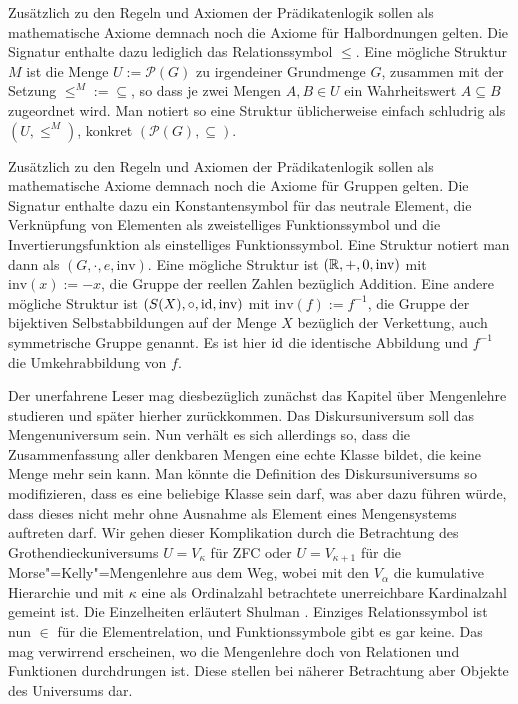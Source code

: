  Zusätzlich zu
den Regeln und Axiomen der Prädikatenlogik sollen als mathematische Axiome
demnach noch die Axiome für Halbordnungen gelten. Die Signatur enthalte
dazu lediglich das Relationssymbol $\le$. Eine mögliche Struktur $M$
ist die Menge $U:=\mathcal P(G)$ zu irgendeiner Grundmenge $G$, zusammen
mit der Setzung ${\le^M} := {\subseteq}$, so dass je zwei Mengen $A,B\in U$
ein Wahrheitswert $A\subseteq B$ zugeordnet wird. Man notiert so
eine Struktur üblicherweise einfach schludrig als $(U,\le^M)$,
konkret $(\mathcal P(G),\subseteq)$.

 Zusätzlich
zu den Regeln und Axiomen der Prädikatenlogik sollen als mathematische Axiome
demnach noch die Axiome für Gruppen gelten. Die Signatur enthalte
dazu ein Konstantensymbol für das neutrale Element, die Verknüpfung von
Elementen als zweistelliges Funktionssymbol und die Invertierungsfunktion
als einstelliges Funktionssymbol. Eine Struktur notiert man dann als
$(G,\cdot,e,\mathrm{inv})$. Eine mögliche Struktur ist $(\mathbb R,+,0,\mathrm{inv})$
mit $\mathrm{inv}(x):=-x$, die Gruppe der reellen Zahlen bezüglich
Addition. Eine andere mögliche Struktur ist $(S(X),\circ,\operatorname{id},\mathrm{inv})$
mit $\mathrm{inv}(f):=f^{-1}$, die Gruppe der bijektiven Selbstabbildungen
auf der Menge $X$ bezüglich der Verkettung, auch symmetrische Gruppe
genannt. Es ist hier $\operatorname{id}$ die identische Abbildung und $f^{-1}$
die Umkehrabbildung von $f$.

 Der unerfahrene Leser mag
diesbezüglich zunächst das Kapitel über Mengenlehre studieren und später
hierher zurückkommen. Das Diskursuniversum soll das Mengenuniversum sein.
Nun verhält es sich allerdings so, dass die Zusammenfassung aller denkbaren
Mengen eine echte Klasse bildet, die keine Menge mehr sein kann. Man
könnte die Definition des Diskursuniversums so modifizieren, dass es eine
beliebige Klasse sein darf, was aber dazu führen würde, dass dieses
nicht mehr ohne Ausnahme als Element eines Mengensystems auftreten darf.
Wir gehen dieser Komplikation durch die Betrachtung des
Grothendieckuniversums $U=V_\kappa$ für ZFC oder $U=V_{\kappa+1}$ für
die Morse"=Kelly"=Mengenlehre aus dem Weg, wobei mit den $V_\alpha$ die
kumulative Hierarchie und mit $\kappa$ eine als Ordinalzahl betrachtete
unerreichbare Kardinalzahl gemeint ist. Die Einzelheiten erläutert
Shulman \cite{Shulman}. Einziges Relationssymbol ist nun  ${\in}$ für
die Elementrelation, und Funktionssymbole gibt es gar keine. Das mag
verwirrend erscheinen, wo die Mengenlehre doch von Relationen und
Funktionen durchdrungen ist. Diese stellen bei näherer Betrachtung aber
Objekte des Universums dar.

